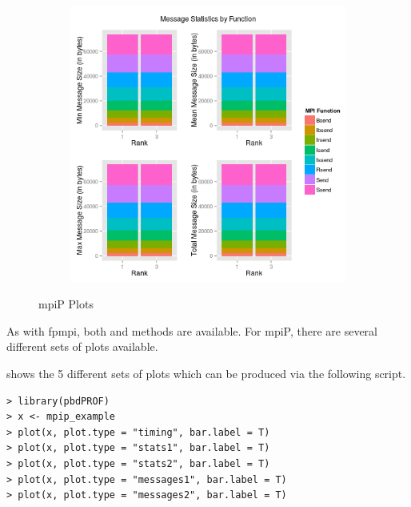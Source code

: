 \begin{figure}
\begin{subfigure}[b]{0.485\textwidth}
        \end{subfigure}\\
        \begin{subfigure}[b]{0.485\textwidth}
            \includegraphics[width=\textwidth]{include/pics/mpip/05_message2}
        \end{subfigure}%
        \caption{mpiP Plots}
        \label{fig:mpip}
\end{figure}


As with fpmpi, both  and  methods are available.  For mpiP, there are several different sets of plots available.

 shows the 5 different sets of plots which can be produced via the following script.
\begin{lstlisting}[language=rr]
> library(pbdPROF)
> x <- mpip_example
> plot(x, plot.type = "timing", bar.label = T)
> plot(x, plot.type = "stats1", bar.label = T)
> plot(x, plot.type = "stats2", bar.label = T)
> plot(x, plot.type = "messages1", bar.label = T)
> plot(x, plot.type = "messages2", bar.label = T)
\end{lstlisting}
